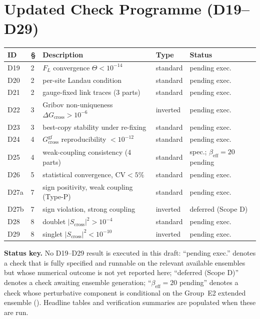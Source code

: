 \documentclass[11pt,a4paper]{article}
\theoremstyle{plain}
\theoremstyle{definition}
\theoremstyle{remark}
\newcommand{\Gcross}{G_{\mathrm{cross}}}
\newcommand{\Gcrossgf}{G_{\mathrm{cross}}^{\mathrm{gf}}}
\newcommand{\Scross}{S_{\mathrm{cross}}}
\newcommand{\be}{\beta_{\mathrm{eff}}}
\newcommand{\FL}{F_{L}}
\begin{document}
\appendix

\section{Updated Check Programme (D19--D29)}
\label{app:checks}

\renewcommand{\arraystretch}{1.2}
\begin{center}
\begin{tabular}{llp{}ll}
\toprule
ID & \S & Description & Type & Status\\
\midrule
D19 & 2 & $\FL$ convergence $\Theta<10^{-14}$ & standard & pending exec.\\
D20 & 2 & per-site Landau condition & standard & pending exec.\\
D21 & 2 & gauge-fixed link traces (3 parts) & standard & pending exec.\\
D22 & 3 & Gribov non-uniqueness $\Delta\Gcross>10^{-6}$ & inverted & pending exec.\\
D23 & 3 & best-copy stability under re-fixing & standard & pending exec.\\
D24 & 4 & $\Gcrossgf$ reproducibility $<10^{-12}$ & standard & pending exec.\\
D25 & 4 & weak-coupling consistency (4 parts) & standard & spec.; $\be{=}20$ pending\\
D26 & 5 & statistical convergence, $\mathrm{CV}<5\%$ & standard & pending exec.\\
D27a & 7 & sign positivity, weak coupling (Type-P) & standard & pending exec.\\
D27b & 7 & sign violation, strong coupling & inverted & deferred (Scope D)\\
D28 & 8 & doublet $|\Scross|^2>10^{-4}$ & standard & pending exec.\\
D29 & 8 & singlet $|\Scross|^2<10^{-10}$ & inverted & pending exec.\\
\bottomrule
\end{tabular}
\end{center}

\noindent
\textbf{Status key.} No D19--D29 result is executed in this draft: ``pending
exec.'' denotes a check that is fully specified and runnable on the relevant
available ensembles but whose numerical outcome is not yet reported here;
``deferred (Scope D)'' denotes a check awaiting ensemble generation; ``$\be{=}20$
pending'' denotes a check whose perturbative component is conditional on the
Group~E2 extended ensemble (). Headline tables and
verification summaries are populated when these are run.
\end{document}

